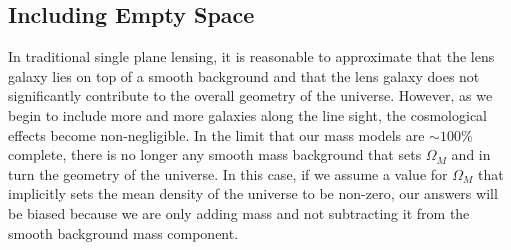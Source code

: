 \subsection{Including Empty Space} \label{sec:Voids}
In traditional single plane lensing, it is reasonable to approximate that the lens galaxy lies on top of a smooth background and that the lens galaxy does not significantly contribute to the overall geometry of the universe. However, as we begin to include more and more galaxies along the line sight, the cosmological effects become non-negligible. In the limit that our mass models are $\sim100\%$ complete, there is no longer any smooth mass background that sets $\Omega_M$ and in turn the geometry of the universe. In this case, if we assume a value for $\Omega_M$ that implicitly sets the mean density of the universe to be non-zero, our answers will be biased because we are only adding mass and not subtracting it from the smooth background mass component. 
